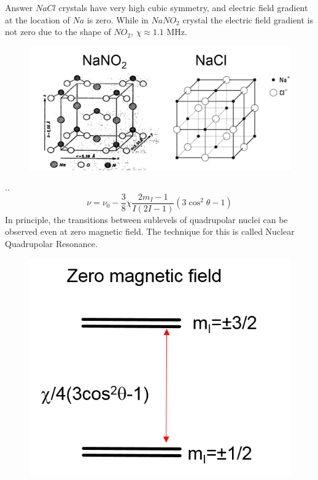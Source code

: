 \documentclass{beamer}
\begin{document}
\begin{frame}
    \begin{block}{Answer}
    	$NaCl$ crystals have very high cubic symmetry, and electric field gradient at the location of $Na$ is zero. While in $NaNO_2$ crystal the electric field gradient is not zero due to the shape of $NO_2$, $\chi \approx 1.1$ MHz.
    	
    \end{block}

	\begin{figure}
		\centering
		\includegraphics[scale=0.5]{figures/Quadrupole3.png}
	\end{figure}
	
	
\end{frame}

\begin{frame}{\thesection.\thesubsection. \insertsubsection}
	\begin{equation}
	\nu = \nu_0 -\dfrac{3}{8} \chi \dfrac{2 m_I -1}{I(2I -1)}(3 \cos^2 \theta - 1)
	\end{equation}
	In principle, the transitions between sublevels of quadrupolar nuclei can be observed even at zero magnetic field. The technique for this is called \alert{Nuclear Quadrupolar Resonance}.
	\begin{figure}
		\centering
		\includegraphics[scale=0.5]{figures/Quadrupole_ZF.png}
	\end{figure}
\end{frame}
\end{document}
